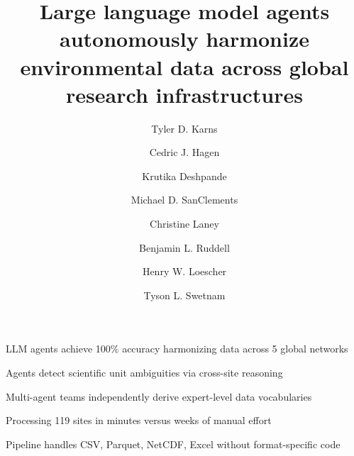 \documentclass[review,authoryear]{elsarticle}
\begin{document}
\begin{frontmatter}

\title{Large language model agents autonomously harmonize environmental data across global research infrastructures}

\author[battelle]{Tyler D. Karns}
\author[neon]{Cedric J. Hagen}
\author[nau]{Krutika Deshpande}
\author[neon]{Michael D. SanClements}
\author[neon]{Christine Laney}
\author[nau]{Benjamin L. Ruddell}
\author[neon]{Henry W. Loescher}
\author[ua]{Tyson L. Swetnam}





\begin{highlights}
\item LLM agents achieve 100\% accuracy harmonizing data across 5 global networks
\item Agents detect scientific unit ambiguities via cross-site reasoning
\item Multi-agent teams independently derive expert-level data vocabularies
\item Processing 119 sites in minutes versus weeks of manual effort
\item Pipeline handles CSV, Parquet, NetCDF, Excel without format-specific code
\end{highlights}


\end{frontmatter}
\end{document}
